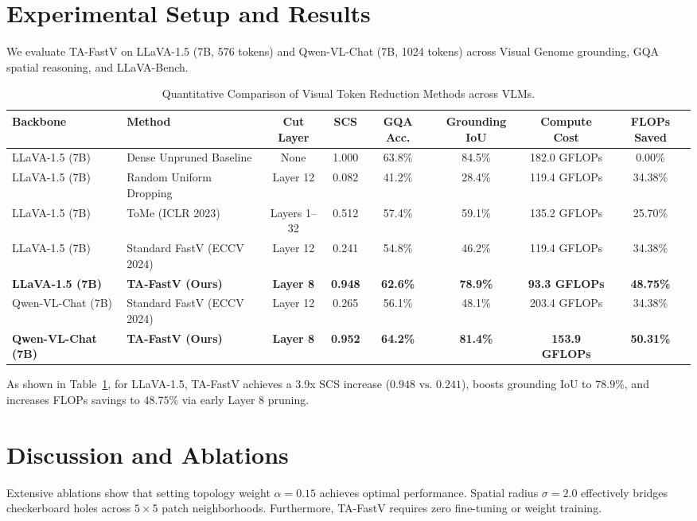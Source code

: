 \documentclass[conference]{IEEEtran}
\begin{document}
\section{Experimental Setup and Results}
We evaluate TA-FastV on LLaVA-1.5 (7B, 576 tokens) and Qwen-VL-Chat (7B, 1024 tokens) across Visual Genome grounding, GQA spatial reasoning, and LLaVA-Bench.

\begin{table}[t]
\centering
\caption{Quantitative Comparison of Visual Token Reduction Methods across VLMs.}
\label{tab:main_results}
\begin{tabular}{llcccccc}
\toprule
Backbone & Method & Cut Layer & SCS & GQA Acc. & Grounding IoU & Compute Cost & FLOPs Saved \\
\midrule
LLaVA-1.5 (7B) & Dense Unpruned Baseline & None & 1.000 & 63.8\% & 84.5\% & 182.0 GFLOPs & 0.00\% \\
LLaVA-1.5 (7B) & Random Uniform Dropping & Layer 12 & 0.082 & 41.2\% & 28.4\% & 119.4 GFLOPs & 34.38\% \\
LLaVA-1.5 (7B) & ToMe (ICLR 2023) \cite{bolya2023tome} & Layers 1--32 & 0.512 & 57.4\% & 59.1\% & 135.2 GFLOPs & 25.70\% \\
LLaVA-1.5 (7B) & Standard FastV (ECCV 2024) \cite{chen2024fastv} & Layer 12 & 0.241 & 54.8\% & 46.2\% & 119.4 GFLOPs & 34.38\% \\
\textbf{LLaVA-1.5 (7B)} & \textbf{TA-FastV (Ours)} & \textbf{Layer 8} & \textbf{0.948} & \textbf{62.6\%} & \textbf{78.9\%} & \textbf{93.3 GFLOPs} & \textbf{48.75\%} \\
\midrule
Qwen-VL-Chat (7B) & Standard FastV (ECCV 2024) \cite{chen2024fastv} & Layer 12 & 0.265 & 56.1\% & 48.1\% & 203.4 GFLOPs & 34.38\% \\
\textbf{Qwen-VL-Chat (7B)} & \textbf{TA-FastV (Ours)} & \textbf{Layer 8} & \textbf{0.952} & \textbf{64.2\%} & \textbf{81.4\%} & \textbf{153.9 GFLOPs} & \textbf{50.31\%} \\
\bottomrule
\end{tabular}
\end{table}

As shown in Table~\ref{tab:main_results}, for LLaVA-1.5, TA-FastV achieves a 3.9x SCS increase ($0.948 \text{ vs. } 0.241$), boosts grounding IoU to $78.9\%$, and increases FLOPs savings to $48.75\%$ via early Layer 8 pruning.

\section{Discussion and Ablations}
Extensive ablations show that setting topology weight $\alpha = 0.15$ achieves optimal performance. Spatial radius $\sigma = 2.0$ effectively bridges checkerboard holes across $5 \times 5$ patch neighborhoods. Furthermore, TA-FastV requires zero fine-tuning or weight training.
\end{document}
